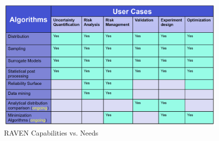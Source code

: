 \begin{figure}[h!]
  \includegraphics[width=\textwidth]{pics/raven_cap.png}
  \caption{RAVEN Capabilities vs. Needs}
  \label{fig:ravenCap}
\end{figure}

